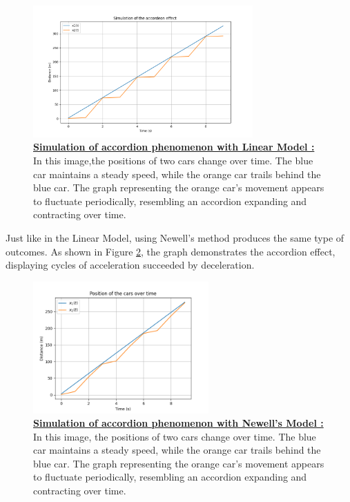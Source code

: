 \documentclass{article}
\begin{document}
		\begin{figure}[H]
			\centering
			\includegraphics[width=0.75\textwidth]{Accordeon1.png}
			\caption[Simulation of accordion phenomenon with Linear Model]{\textbf{\underline{Simulation of accordion phenomenon with Linear Model : }} In this image,the positions of two cars change over time. The blue car maintains a steady speed, while the orange car trails behind the blue car. The graph representing the orange car's movement appears to fluctuate periodically, resembling an accordion expanding and contracting over time.}
			\label{fig:Aco1}
		\end{figure}
		
		\newpage
		Just like in the Linear Model, using Newell's method produces the same type of outcomes. As shown in Figure \ref{fig:1W2_ACCORD}, the graph demonstrates the accordion effect, displaying cycles of acceleration succeeded by deceleration.
		
		\begin{figure}[H]
			\centering
			\includegraphics[width=0.60\textwidth]{1W2_Accord.png}
			\caption[Simulation of accordion phenomenon with Newell's Model]{\textbf{\underline{Simulation of accordion phenomenon with Newell's Model : }} In this image, the positions of two cars change over time. The blue car maintains a steady speed, while the orange car trails behind the blue car. The graph representing the orange car's movement appears to fluctuate periodically, resembling an accordion expanding and contracting over time.}
			\label{fig:1W2_ACCORD}
		\end{figure}
		
\end{document}
